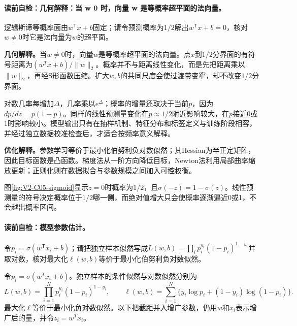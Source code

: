 \label{struct:V2-C05-CH14}
\paragraph{读前自检：几何解释：当 w 0 时，向量 w 是等概率超平面的法向量。}逻辑斯谛等概率面由$w^{\mathsf T}x+b$固定；请令预测概率为$1/2$解出$w^{\mathsf T}x+b=0$，核对$w\ne0$时它是法向量为$w$的超平面。\par

\begin{geometrybox}
\textbf{几何解释。}当$w\neq0$时，向量$w$是等概率超平面的法向量。点$x$到$1/2$分界面的有符号距离为$(w^Tx+b)/\lVert w\rVert_2$。概率并不与距离线性变化，而是先把距离乘以$\lVert w\rVert_2$，再经S形函数压缩。扩大$w,b$的共同尺度会使过渡带变窄，却不改变$1/2$分界面。
\end{geometrybox}

\label{struct:V2-C05-CH15}
\begin{probabilitybox}
对数几率每增加$\Delta$，几率乘以$e^{\Delta}$；概率的增量还取决于当前$p$，因为$dp/dz=p(1-p)$。同样的线性预测量变化在$p\approx1/2$附近影响较大，在$p$接近0或1时影响较小。模型输出只有在抽样机制、特征分布和标签定义与训练阶段相容，并经过独立数据校准检查后，才适合按频率意义解释。

\textbf{优化解释。}参数学习等价于最小化伯努利负对数似然；其Hessian为半正定矩阵，因此目标函数是凸函数。梯度法从一阶方向降低目标，Newton法利用局部曲率缩放更新；正则化则在数据拟合与参数规模之间加入可控权衡。
\end{probabilitybox}

\label{struct:V2-C05-CH17}

图\ref{fig:V2-C05-sigmoid}显示$z=0$时概率为$1/2$，且$\sigma(-z)=1-\sigma(z)$。线性预测量的符号决定概率位于$1/2$哪一侧，而绝对值增大只会使概率逐渐逼近0或1，不会越出概率区间。


\paragraph{读前自检：模型参数估计。}令$p_i=\sigma(w^{\mathsf T}x_i+b)$；请把独立样本似然写成$L(w,b)=\prod_i p_i^{y_i}(1-p_i)^{1-y_i}$并取对数，核对最大化$\ell(w,b)$等价于最小化伯努利负对数似然。\par

令$p_i=\sigma(w^Tx_i+b)$。独立样本的条件似然与对数似然分别为
\[
L(w,b)=\prod_{i=1}^{N}p_i^{y_i}(1-p_i)^{1-y_i},
\qquad
\ell(w,b)=\sum_{i=1}^{N}\{y_i\log p_i+(1-y_i)\log(1-p_i)\}.
\]
最大化$\ell$等价于最小化负对数似然。以下把截距并入增广参数，仍用$w$和$x_i$表示增广后的量，并令$z_i=w^Tx_i$。

